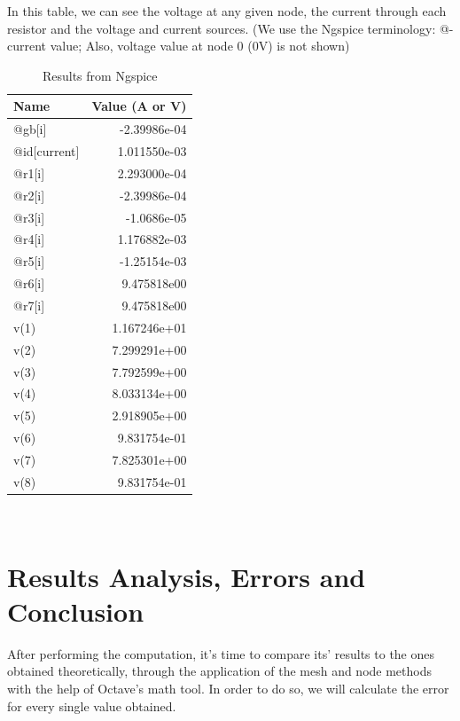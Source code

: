 \documentclass[11en, a4paper, oneside]{article}
\begin{document}
In this table, we can see the voltage at any given node, the current through each resistor and the voltage and current sources. (We use the Ngspice terminology: @-current value; Also, voltage value at node 0 (0V) is not shown)
\clearpage
\begin{table}[h]
\label{tab1}
\begin{center}
\begin{tabular}{|l|r|}
\hline
\textbf{Name}    & \textbf{Value (A or V)} \\\hline
@gb{[}i{]}       & -2.39986e-04            \\\hline
@id{[}current{]} & 1.011550e-03            \\\hline
@r1{[}i{]}       & 2.293000e-04            \\\hline
@r2{[}i{]}       & -2.39986e-04            \\\hline
@r3{[}i{]}       & -1.0686e-05             \\\hline
@r4{[}i{]}       & 1.176882e-03            \\\hline
@r5{[}i{]}       & -1.25154e-03            \\\hline
@r6{[}i{]}       & 9.475818e00             \\\hline
@r7{[}i{]}       & 9.475818e00             \\\hline
v(1)             & 1.167246e+01            \\\hline
v(2)             & 7.299291e+00            \\\hline
v(3)             & 7.792599e+00            \\\hline
v(4)             & 8.033134e+00            \\\hline
v(5)             & 2.918905e+00            \\\hline
v(6)             & 9.831754e-01            \\\hline
v(7)             & 7.825301e+00            \\\hline
v(8)             & 9.831754e-01         \\\hline

\end{tabular}
\caption{Results from Ngspice} \label{tab:sometab}
\end{center}
\
\end{table}



\section{Results Analysis, Errors and Conclusion}
\label{resan}
After performing the computation, it's time to compare its' results to the ones obtained theoretically, through the application of the mesh and node methods with the help of Octave's math tool. In order to do so, we will calculate the error for every single value obtained.
\end{document}
